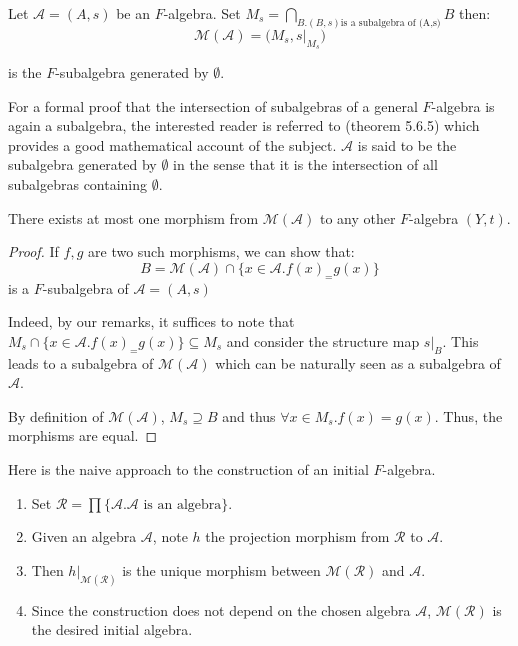 \begin{construction}
	Let $\mathcal{A}=(A,s)$ be an $F$-algebra. Set $M_s = \bigcap_{B. (B,s) \text{is a subalgebra of (A,s)}} B$ then: \[
	\mathcal{M}(\mathcal{A}) = \Big(M_s,s \Big|_{M_s} \Big)\]
	
	is the $F$-subalgebra generated by $\emptyset$.
\end{construction}	

For a formal proof that the intersection of subalgebras of a general $F$-algebra is again a subalgebra, the interested reader is referred to \cite{denecke2009universal} (theorem 5.6.5) which provides a good mathematical account of the subject. $\mathcal{A}$ is said to be the subalgebra generated by $\emptyset$ in the sense that it is the intersection of all subalgebras containing $\emptyset$. \\
	
\begin{lemma}\label{lem}
	There exists at most one morphism from $\mathcal{M}(\mathcal{A})$ to any other $F$-algebra $(Y,t)$.
\end{lemma}	
\begin{proof}
	If $f,g$ are two such morphisms, we can show that: $$B = \mathcal{M}(\mathcal{A}) \cap \{x \in \mathcal{A}. f(x) _= g(x)\}$$ is a $F$-subalgebra of $\mathcal{A}=(A,s)$
	
	Indeed, by our remarks, it suffices to note that $M_s \cap \{x \in \mathcal{A}. f(x) _= g(x)\} \subseteq M_s$ and consider the structure map $s|_B$. This leads to a subalgebra of $\mathcal{M}(\mathcal{A})$ which can be naturally seen as a subalgebra of $\mathcal{A}$. 
	
	By definition of $\mathcal{M}(\mathcal{A})$, $M_s \supseteq B$ and thus $\forall x \in M_s. f(x) = g(x)$. Thus, the morphisms are equal. 
\end{proof}
	
Here is the naive approach to the construction of an initial $F$-algebra.

\begin{enumerate}
	\item Set $\mathcal{R} = \prod \{\mathcal{A}. \mathcal{A} \text{ is an algebra}\}$.
	\item Given an algebra $\mathcal{A}$, note $h$ the projection morphism from $\mathcal{R}$ to $\mathcal{A}$.
	\item Then $h|_{\mathcal{M}(\mathcal{R})}$ is the unique morphism between $\mathcal{M}(\mathcal{R})$ and $\mathcal{A}$.
	\item Since the construction does not depend on the chosen algebra $\mathcal{A}$,  $\mathcal{M}(\mathcal{R})$ is the desired initial algebra.
\end{enumerate}

